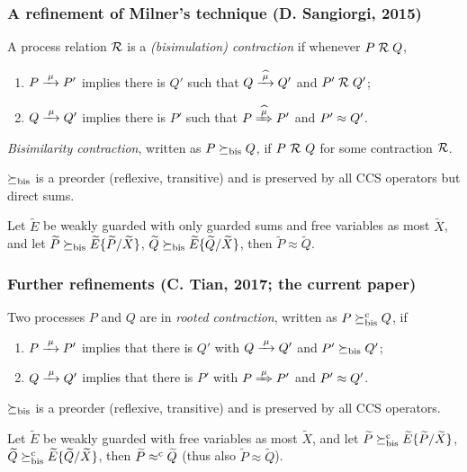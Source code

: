 \begin{frame}
\frametitle{A refinement of Milner's technique (D. Sangiorgi, 2015)}
\begin{small}
\begin{definition}[Contraction]
A process relation ${{\cal R}}$ 
 is a \emph{(bisimulation) contraction} if whenever
 $P\mathrel{\cal R} Q$, %
\begin{enumerate}
\item  $P \arr\mu P'$ implies there is $Q'$ such that $Q \arcap \mu
  Q'$ and $P' \mathrel{\cal R} Q'$;
\item $Q \arr\mu Q'$   implies there is $P'$ such that $P \Arcap \mu
 P'$ and $P' \approx Q'$\enspace.
\end{enumerate}
\emph{Bisimilarity contraction}, written as $P \mathrel{\succeq_\mathrm{bis}} Q$, if $P\ {\cal R}\ Q$ for some contraction ${\cal R}$.
%
\end{definition}
\end{small}
\begin{lemma}
$\mathrel{\succeq_\mathrm{bis}}$ is a preorder (reflexive, transitive) and is preserved by
all CCS operators but direct sums.
\end{lemma}
\begin{theorem}
Let $\tilde{E}$ be weakly guarded with only guarded sums and
free variables as most $\tilde{X}$, and let
$\widetilde{P}\mathrel{\succeq_\mathrm{bis}}\widetilde{E}\{\widetilde{P}/\widetilde{X}\}$,
$\widetilde{Q}\mathrel{\succeq_\mathrm{bis}}\widetilde{E}\{\widetilde{Q}/\widetilde{X}\}$, then $\tilde{P}\approx\tilde{Q}$.
\end{theorem}
\end{frame}

\begin{frame}
\frametitle{Further refinements (C. Tian, 2017; the current paper)}
\begin{definition}
Two processes $P$ and $Q$ are in \emph{rooted contraction}, written as
 $P\mathrel{\succeq^\mathrm{c}_\mathrm{bis}} Q$, if
\begin{enumerate}
\item $P \arr\mu P'$ implies that there is $Q'$ with $Q \arr \mu Q'$
 and $P'\mathrel{\succeq_\mathrm{bis}} Q'$;
\item $Q \arr\mu Q'$   implies that there is $P'$ with $P \Arr \mu
 P'$ and $P' \approx Q'$\enspace.
\end{enumerate}
\end{definition}
\begin{lemma}
$\mathrel{\succeq_\mathrm{bis}}$ is a preorder (reflexive, transitive) and is preserved by
all CCS operators.
\end{lemma}
\begin{theorem}
Let $\tilde{E}$ be weakly guarded with free variables as most $\tilde{X}$, and let
$\widetilde{P}\mathrel{\succeq^\mathrm{c}_\mathrm{bis}}\widetilde{E}\{\widetilde{P}/\widetilde{X}\}$,
$\widetilde{Q}\mathrel{\succeq^\mathrm{c}_\mathrm{bis}}\widetilde{E}\{\widetilde{Q}/\widetilde{X}\}$, then
$\widetilde{P}\mathrel{\approx^{\mathrm{c}}}\widetilde{Q}$ (thus also $\tilde{P}\approx\tilde{Q}$).
\end{theorem}
\end{frame}

